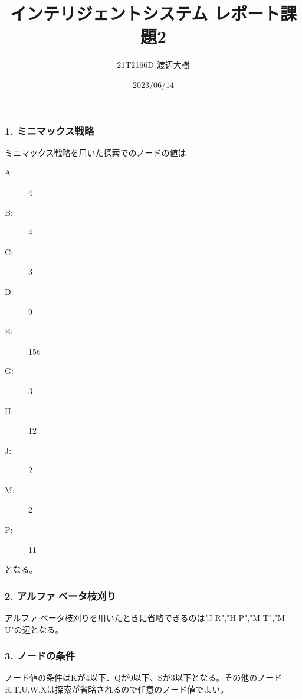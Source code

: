 \documentclass[a4paper,11pt,dvipdfmx]{jsarticle}
\begin{document}
\title{インテリジェントシステム レポート課題2}
\author{21T2166D 渡辺大樹}
\date{2023/06/14}
\maketitle
\subsubsection*{1. ミニマックス戦略}
ミニマックス戦略を用いた探索でのノードの値は
\begin{center}
\begin{description}
    \item[A:] 4
    \item[B:] 4
    \item[C:] 3
    \item[D:] 9
    \item[E:] 15t
    \item[G:] 3
    \item[H:] 12
    \item[J:] 2
    \item[M:] 2
    \item[P:] 11 
\end{description}
\end{center}
となる。

\subsubsection*{2. アルファ$\cdot$ベータ枝刈り}
アルファ$\cdot$ベータ枝刈りを用いたときに省略できるのは"J-R","H-P","M-T","M-U"の辺となる。

\subsubsection*{3. ノードの条件}
ノード値の条件はKが4以下、Qが9以下、Sが3以下となる。その他のノードR,T,U,W,Xは探索が省略されるので任意のノード値でよい。
\end{document}
